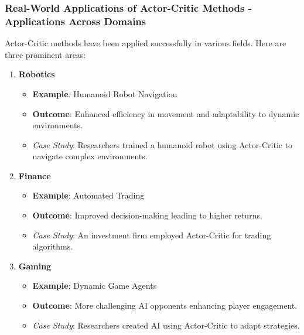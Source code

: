 \documentclass{beamer}
\begin{document}
\begin{frame}[fragile]
    \frametitle{Real-World Applications of Actor-Critic Methods - Applications Across Domains}
    Actor-Critic methods have been applied successfully in various fields. Here are three prominent areas:
    
    \begin{enumerate}
        \item \textbf{Robotics}
            \begin{itemize}
                \item \textbf{Example}: Humanoid Robot Navigation
                \item \textbf{Outcome}: Enhanced efficiency in movement and adaptability to dynamic environments.
                \item \textit{Case Study}: Researchers trained a humanoid robot using Actor-Critic to navigate complex environments.
            \end{itemize}
            
        \item \textbf{Finance}
            \begin{itemize}
                \item \textbf{Example}: Automated Trading
                \item \textbf{Outcome}: Improved decision-making leading to higher returns.
                \item \textit{Case Study}: An investment firm employed Actor-Critic for trading algorithms.
            \end{itemize}
            
        \item \textbf{Gaming}
            \begin{itemize}
                \item \textbf{Example}: Dynamic Game Agents
                \item \textbf{Outcome}: More challenging AI opponents enhancing player engagement.
                \item \textit{Case Study}: Researchers created AI using Actor-Critic to adapt strategies.
            \end{itemize}
    \end{enumerate}
\end{frame}
\end{document}
